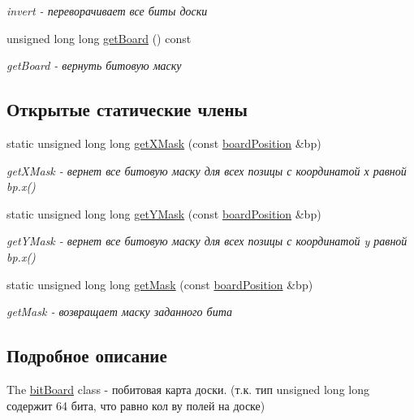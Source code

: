 \begin{DoxyCompactItemize}
\begin{DoxyCompactList}\small\item\em invert -\/ переворачивает все биты доски \end{DoxyCompactList}\item 
unsigned long long \hyperlink{classbit_board_afe3388c61bf3046f85ce48f287f2d912}{get\+Board} () const 
\begin{DoxyCompactList}\small\item\em get\+Board -\/ вернуть битовую маску \end{DoxyCompactList}\end{DoxyCompactItemize}
\subsection*{Открытые статические члены}
\begin{DoxyCompactItemize}
\item 
static unsigned long long \hyperlink{classbit_board_a31dd95717cbb107a4fe6d334407dfd4e}{get\+X\+Mask} (const \hyperlink{classboard_position}{board\+Position} \&bp)
\begin{DoxyCompactList}\small\item\em get\+X\+Mask -\/ вернет все битовую маску для всех позицы с координатой х равной bp.\+x() \end{DoxyCompactList}\item 
static unsigned long long \hyperlink{classbit_board_acc9d2cf1cd3af85481f5a26ffc656794}{get\+Y\+Mask} (const \hyperlink{classboard_position}{board\+Position} \&bp)
\begin{DoxyCompactList}\small\item\em get\+Y\+Mask -\/ вернет все битовую маску для всех позицы с координатой y равной bp.\+x() \end{DoxyCompactList}\item 
static unsigned long long \hyperlink{classbit_board_a2476b527524fbf53a6c55554e1225b76}{get\+Mask} (const \hyperlink{classboard_position}{board\+Position} \&bp)
\begin{DoxyCompactList}\small\item\em get\+Mask -\/ возвращает маску заданного бита \end{DoxyCompactList}\end{DoxyCompactItemize}


\subsection{Подробное описание}
The \hyperlink{classbit_board}{bit\+Board} class -\/ побитовая карта доски. (т.\+к. тип unsigned long long содержит 64 бита, что равно кол ву полей на доске) 


